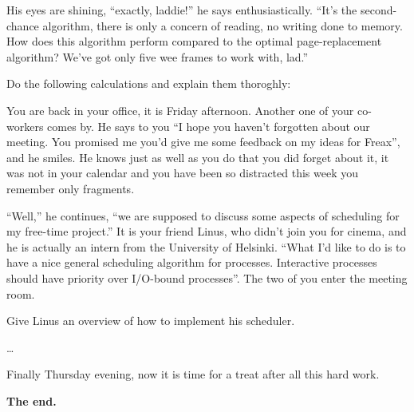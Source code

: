 \documentclass[addpoints,svv]{miunexam}
\begin{document}
\begin{questions}
  His eyes are shining, ``exactly, laddie!'' he says enthusiastically.
  ``It's the second-chance algorithm, there is only a concern of reading, no 
  writing done to memory.  How does this algorithm perform compared to the 
  optimal page-replacement algorithm?  We've got only five wee frames to work 
  with, lad.''

  Do the following calculations and explain them thoroghly:

  \question[3]\label{q:scheduling}
  You are back in your office, it is Friday afternoon.
  Another one of your co-workers comes by.
  He says to you ``I hope you haven't forgotten about our meeting.
  You promised me you'd give me some feedback on my ideas for Freax'', and he 
  smiles.
  He knows just as well as you do that you did forget about it, it was not in 
  your calendar and you have been so distracted this week you remember only 
  fragments.

  ``Well,'' he continues, ``we are supposed to discuss some aspects of 
  scheduling for my free-time project.''
  It is your friend Linus, who didn't join you for cinema, and he is actually 
  an intern from the University of Helsinki.
  ``What I'd like to do is to have a nice general scheduling algorithm for 
  processes.
  Interactive processes should have priority over I/O-bound processes''.
  The two of you enter the meeting room.

  Give Linus an overview of how to implement his scheduler.
  \begin{solution}
    \dots
  \end{solution}
\end{questions}

Finally Thursday evening, now it is time for a treat after all this hard work.
\begin{center}
  \textbf{The end.}
\end{center}


\end{document}
